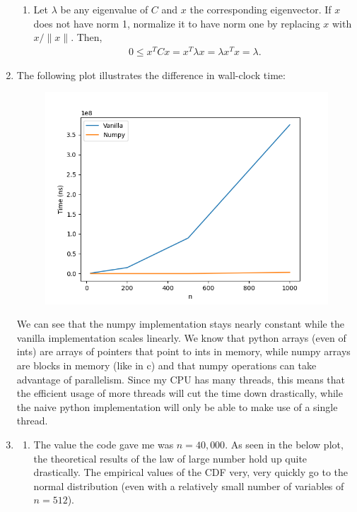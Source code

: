 \documentclass[12pt]{article}
\theoremstyle{definitionstyle}
\newcommand{\mg}[1]{\| #1 \|}
\begin{document}
\begin{enumerate}[leftmargin=\labelsep]
\begin{enumerate}
			\item Let $\lambda$ be any eigenvalue of $C$ and $x$ the corresponding eigenvector. If $x$ does not have norm 1, normalize it to have norm one by replacing $x$ with $x/\mg{x}$. Then,
			\begin{align*}
				0 \leq x^TCx = x^T\lambda x = \lambda x^Tx = \lambda.
			\end{align*}
		\end{enumerate}
	
		\item The following plot illustrates the difference in wall-clock time:
		
		\begin{figure}[H]
			\centering
			\includegraphics[scale=0.5]{wallclocktimes.png}
		\end{figure}
	
		We can see that the numpy implementation stays nearly constant while the vanilla implementation scales linearly. We know that python arrays (even of ints) are arrays of pointers that point to ints in memory, while numpy arrays are blocks in memory (like in c) and that numpy operations can take advantage of parallelism. Since my CPU has many threads, this means that the efficient usage of more threads will cut the time down drastically, while the naive python implementation will only be able to make use of a single thread.
		
		\item \begin{enumerate}
			\item The value the code gave me was $n = 40,000$. As seen in the below plot, the theoretical results of the law of large number hold up quite drastically. The empirical values of the CDF very, very quickly go to the normal distribution (even with a relatively small number of variables of $n=512$). 
			

\end{enumerate}
\end{enumerate}
\end{document}
